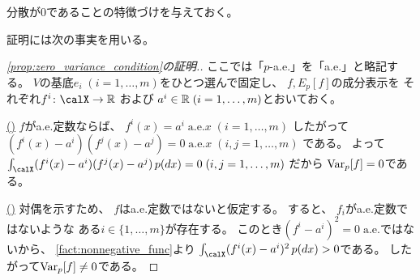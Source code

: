 \documentclass[report]{jlreq}
\begin{document}
分散が0であることの特徴づけを与えておく。


証明には次の事実を用いる。


\begin{proof}[\cref{prop:zero_variance_condition}の証明.]
    ここでは「$p$-a.e.」を「a.e.」と略記する。
    $V$の基底$e_i \; (i = 1, \dots, m)$をひとつ選んで固定し、
    $f, E_p[f]$の成分表示を
    それぞれ$f^i \colon \calX \to \R$
    および
    $a^i \in \mathbb{R} \; (i = 1, \dots, m)$とおいておく。

    \uline{(\Leftarrow)} \quad
    $f$がa.e.定数ならば、
    $f^i(x) = a^i \;
        \text{a.e.$x$} \;
        (i = 1, \dots, m)$
    したがって
    $(f^i(x) - a^i)(f^j(x) - a^j) = 0 \;
        \text{a.e.$x$} \;
        (i, j = 1, \dots, m)$
    である。
    よって
    $\int_\calX (f^i(x) - a^i)(f^j(x) - a^j) \, p(dx) = 0 \;
        (i, j = 1, \dots, m)$
    だから
    $\operatorname{Var}_p[f] = 0$である。

    \uline{(\Rightarrow)} \quad
    対偶を示すため、
    $f$はa.e.定数ではないと仮定する。
    すると、
    $f_i$がa.e.定数ではないような
    ある$i \in \{ 1, \dots, m \}$が存在する。
    このとき$(f^i - a^i)^2 = 0 \; \text{a.e.}$ではないから、
    \cref{fact:nonnegative_func}より
    $\int_\calX (f^i(x) - a^i)^2 \, p(dx) > 0$である。
    したがって$\operatorname{Var}_p[f] \neq 0$である。
\end{proof}
\end{document}
